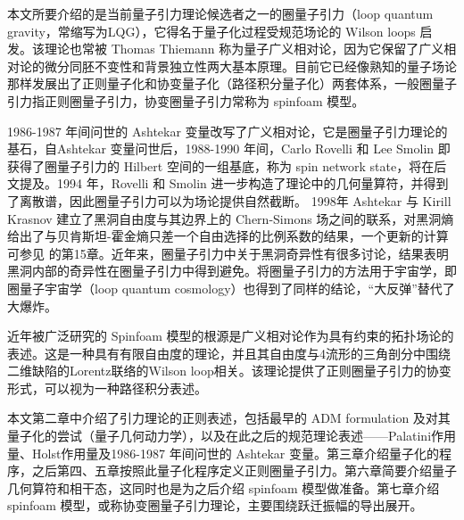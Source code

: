 	本文所要介绍的是当前量子引力理论候选者之一的圈量子引力（loop quantum gravity，常缩写为LQG），它得名于量子化过程受规范场论的 Wilson loops 启发。该理论也常被 Thomas Thiemann 称为量子广义相对论\cite{Thiemann2007}，因为它保留了广义相对论的微分同胚不变性和背景独立性两大基本原理。目前它已经像熟知的量子场论那样发展出了正则量子化和协变量子化（路径积分量子化）两套体系，一般圈量子引力指正则圈量子引力，协变圈量子引力常称为 spinfoam 模型。

	1986-1987 年间问世的 Ashtekar 变量改写了广义相对论，它是圈量子引力理论的基石，自Ashtekar 变量问世后，1988-1990 年间，Carlo Rovelli 和 Lee Smolin 即获得了圈量子引力的 Hilbert 空间的一组基底\cite{Rovelli1988,Rovelli1989}，称为 spin network state，将在后文提及。1994 年，Rovelli 和 Smolin 进一步构造了理论中的几何量算符，并得到了离散谱\cite{Rovelli1994}，因此圈量子引力可以为场论提供自然截断。 1998年 Ashtekar 与 Kirill Krasnov 建立了黑洞自由度与其边界上的 Chern-Simons 场之间的联系，对黑洞熵给出了与贝肯斯坦-霍金熵只差一个自由选择的比例系数的结果\cite{Ashtekar:1998ue}，一个更新的计算可参见\cite{Thiemann2007} 的第15章。近年来，圈量子引力中关于黑洞奇异性有很多讨论\cite{Ashtekar:2018lag,Ashtekar:2018cay,Ashtekar:2005qt,Bohmer:2007wi,Olmedo:2017lvt}，结果表明黑洞内部的奇异性在圈量子引力中得到避免。将圈量子引力的方法用于宇宙学，即圈量子宇宙学（loop quantum cosmology）也得到了同样的结论，“大反弹”替代了大爆炸\cite{Ashtekar:2011ni}。

	近年被广泛研究的 Spinfoam 模型的根源是广义相对论作为具有约束的拓扑场论的表述\cite{Bianchi2017}。这是一种具有有限自由度的理论，并且其自由度与4流形的三角剖分中围绕二维缺陷的Lorentz联络的Wilson loop相关。该理论提供了正则圈量子引力的协变形式，可以视为一种路径积分表述。
	
	本文第二章中介绍了引力理论的正则表述，包括最早的 ADM formulation 及对其量子化的尝试（量子几何动力学），以及在此之后的规范理论表述——Palatini作用量、Holst作用量及1986-1987 年间问世的 Ashtekar 变量。第三章介绍量子化的程序，之后第四、五章按照此量子化程序定义正则圈量子引力。第六章简要介绍量子几何算符和相干态，这同时也是为之后介绍 spinfoam 模型做准备。第七章介绍 spinfoam 模型，或称协变圈量子引力理论，主要围绕跃迁振幅的导出展开。
